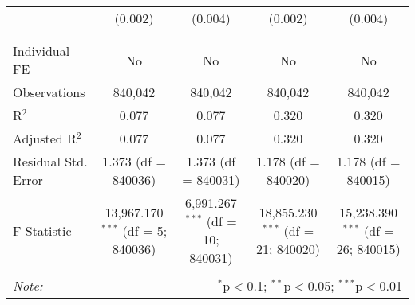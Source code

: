 \documentclass[
]{article}
\begin{document}
\begin{table}[!htbp]
{\begin{tabular}{@{\extracolsep{5pt}}lcccc}
  & (0.002) & (0.004) & (0.002) & (0.004) \\ 
  & & & & \\ 
\hline \\[-1.8ex] 
Individual FE & No & No & No & No \\ 
Observations & 840,042 & 840,042 & 840,042 & 840,042 \\ 
R$^{2}$ & 0.077 & 0.077 & 0.320 & 0.320 \\ 
Adjusted R$^{2}$ & 0.077 & 0.077 & 0.320 & 0.320 \\ 
Residual Std. Error & 1.373 (df = 840036) & 1.373 (df = 840031) & 1.178 (df = 840020) & 1.178 (df = 840015) \\ 
F Statistic & 13,967.170$^{***}$ (df = 5; 840036) & 6,991.267$^{***}$ (df = 10; 840031) & 18,855.230$^{***}$ (df = 21; 840020) & 15,238.390$^{***}$ (df = 26; 840015) \\ 
\hline 
\hline \\[-1.8ex] 
\textit{Note:}  & \multicolumn{4}{r}{$^{*}$p$<$0.1; $^{**}$p$<$0.05; $^{***}$p$<$0.01} \\ 
\end{tabular}
} 
\end{table} 
\newpage
\end{document}
